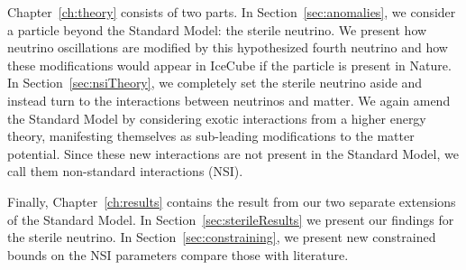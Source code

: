 Chapter~\ref{ch:theory} consists of two parts. In Section~\ref{sec:anomalies}, we consider a particle beyond the Standard Model: the sterile neutrino. 
We present how neutrino oscillations are modified by this hypothesized fourth neutrino and how these modifications would appear in IceCube if the particle is present in Nature. 
In Section~\ref{sec:nsiTheory}, we completely set the sterile neutrino aside and instead turn to the interactions between neutrinos and matter. 
We again amend the Standard Model by considering exotic interactions from a higher energy theory, manifesting themselves as sub-leading modifications to the matter potential. 
Since these new interactions are not present in the Standard Model, we call them non-standard interactions (NSI). 

Finally, Chapter~\ref{ch:results} contains the result from our two separate extensions of the Standard Model.
In Section~\ref{sec:sterileResults} we present our findings for the sterile neutrino. 
In Section~\ref{sec:constraining}, we present new constrained bounds on the NSI parameters compare those with literature.
